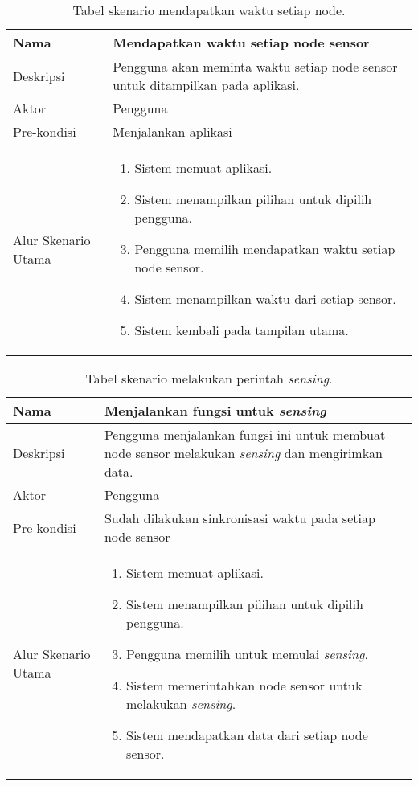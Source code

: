 \begin{table}[H]
    \centering
    \caption{Tabel skenario mendapatkan waktu setiap node.}
    \begin{tabular}{|p{3cm}|p{10cm}|}
    \hline
        Nama & Mendapatkan waktu setiap node sensor\\
    \hline
    \hline
        Deskripsi & Pengguna akan meminta waktu setiap node sensor untuk ditampilkan pada aplikasi. \\
    \hline
        Aktor & Pengguna \\
    \hline
        Pre-kondisi & Menjalankan aplikasi \\
    \hline
        Alur Skenario Utama & 
        \begin{enumerate}
            \item Sistem memuat aplikasi.
            \item Sistem menampilkan pilihan untuk dipilih pengguna.
            \item Pengguna memilih mendapatkan waktu setiap node sensor.
            \item Sistem menampilkan waktu dari setiap sensor.
            \item Sistem kembali pada tampilan utama.
        \end{enumerate}\\
    \hline
    \end{tabular}
    \label{tab:skenario3}
\end{table}

\begin{table}[H]
    \centering
    \caption{Tabel skenario melakukan perintah \textit{sensing}.}
    \begin{tabular}{|p{3cm}|p{10cm}|}
    \hline
        Nama & Menjalankan fungsi untuk \textit{sensing}\\
    \hline
    \hline
        Deskripsi & Pengguna menjalankan fungsi ini untuk membuat node sensor melakukan \textit{sensing} dan mengirimkan data.\\
    \hline
        Aktor & Pengguna \\
    \hline
        Pre-kondisi & Sudah dilakukan sinkronisasi waktu pada setiap node sensor\\
    \hline
        Alur Skenario Utama & 
        \begin{enumerate}
            \item Sistem memuat aplikasi.
            \item Sistem menampilkan pilihan untuk dipilih pengguna.
            \item Pengguna memilih untuk memulai \textit{sensing}.
            \item Sistem memerintahkan node sensor untuk melakukan \textit{sensing}.
            \item Sistem mendapatkan data dari setiap node sensor.
        \end{enumerate}\\
    \hline
    \end{tabular}
    \label{tab:skenario4}
\end{table}

